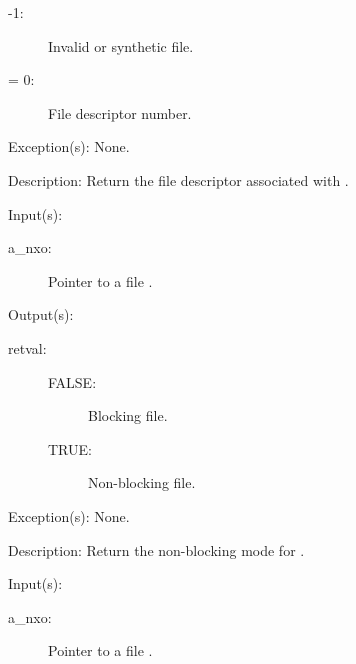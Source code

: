 \begin{capi}
\begin{capilist}
\begin{description}
			\begin{description}\item[]
			\item[-1: ]
				Invalid or synthetic file.
			\item[{\gt}= 0: ]
				File descriptor number.
			\end{description}
		\end{description}
	\item[Exception(s): ] None.
	\item[Description: ]
		Return the file descriptor associated with .
	\end{capilist}
\label{nxo_file_nonblocking_get}
	\begin{capilist}
	\item[Input(s): ]
		\begin{description}\item[]
		\item[a\_nxo: ]
			Pointer to a file .
		\end{description}
	\item[Output(s): ]
		\begin{description}\item[]
		\item[retval: ]
			\begin{description}\item[]
			\item[FALSE: ]
				Blocking file.
			\item[TRUE: ]
				Non-blocking file.
			\end{description}
		\end{description}
	\item[Exception(s): ] None.
	\item[Description: ]
		Return the non-blocking mode for .
	\end{capilist}
\label{nxo_file_nonblocking_set}
	\begin{capilist}
	\item[Input(s): ]
		\begin{description}\item[]
		\item[a\_nxo: ]
			Pointer to a file \classname{nxo}.

\end{description}
\end{capilist}
\end{capi}

